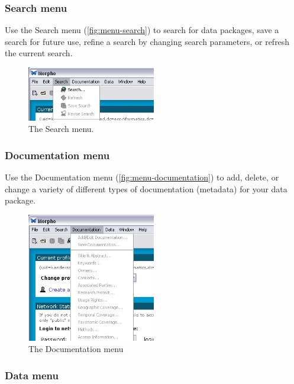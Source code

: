 \subsubsection{Search menu} \label{sec:menu-search}

Use the Search menu (\autoref{fig:menu-search}) to search for data
packages, save a search for future use, refine a search by changing
search parameters, or refresh the current search. 

\begin{figure}
  \centering
    \includegraphics[width=0.5\textwidth]{images/menu-search.jpg}
  \caption{The Search menu.}
  \label{fig:menu-search}
\end{figure}

\subsubsection{Documentation menu} \label{sec:menu-documentation}

Use the Documentation menu (\autoref{fig:menu-documentation}) to add,
delete, or change a variety of different types of documentation
(metadata) for your data package. 

\begin{figure}
  \centering
    \includegraphics[width=0.5\textwidth]{images/menu-documentation.jpg}
  \caption{The Documentation menu}
  \label{fig:menu-documentation}
\end{figure}

\subsubsection{Data menu} \label{sec:menu-data}

